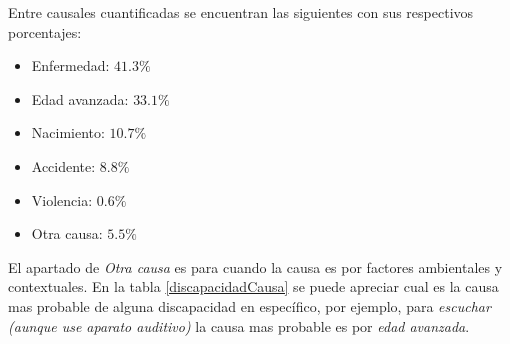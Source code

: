Entre causales cuantificadas se encuentran las siguientes con sus respectivos
 porcentajes:

\begin{itemize}
	\item Enfermedad: $41.3\%$
	\item Edad avanzada: $33.1\%$
	\item Nacimiento: $10.7\%$
	\item Accidente: $8.8\%$
	\item Violencia: $0.6\%$
	\item Otra causa: $5.5\%$
\end{itemize}


El apartado de \emph{Otra causa} es para cuando la causa es por factores 
 ambientales y contextuales. En la tabla \ref{discapacidadCausa} se puede 
 apreciar cual es la causa mas probable de alguna discapacidad en 
 espec\'ifico, por ejemplo, para \emph{escuchar (aunque use aparato 
 auditivo)} la causa mas probable es por \emph{edad avanzada}. 


